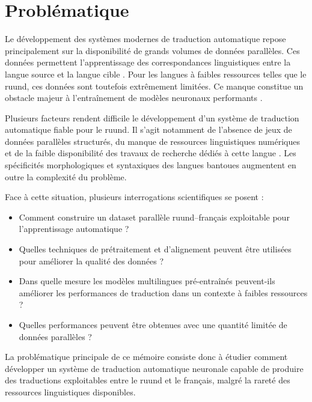 \section{Problématique}

Le développement des systèmes modernes de traduction automatique repose principalement sur la disponibilité de grands volumes de données parallèles. Ces données permettent l'apprentissage des correspondances linguistiques entre la langue source et la langue cible \cite{ranathunga2023neural}. Pour les langues à faibles ressources telles que le ruund, ces données sont toutefois extrêmement limitées. Ce manque constitue un obstacle majeur à l'entraînement de modèles neuronaux performants \cite{haulai2023construction, agyei2024low}.

Plusieurs facteurs rendent difficile le développement d'un système de traduction automatique fiable pour le ruund. Il s'agit notamment de l'absence de jeux de données parallèles structurés, du manque de ressources linguistiques numériques et de la faible disponibilité des travaux de recherche dédiés à cette langue \cite{jindal2017building, haulai2023construction}. Les spécificités morphologiques et syntaxiques des langues bantoues augmentent en outre la complexité du problème.

Face à cette situation, plusieurs interrogations scientifiques se posent :

\begin{itemize}
    \item Comment construire un dataset parallèle ruund--français exploitable pour l'apprentissage automatique ?

    \item Quelles techniques de prétraitement et d'alignement peuvent être utilisées pour améliorer la qualité des données  ?

    \item Dans quelle mesure les modèles multilingues pré-entraînés peuvent-ils améliorer les performances de traduction dans un contexte à faibles ressources ?

    \item Quelles performances peuvent être obtenues avec une quantité limitée de données parallèles ?
\end{itemize}

La problématique principale de ce mémoire consiste donc à étudier comment développer un système de traduction automatique neuronale capable de produire des traductions exploitables entre le ruund et le français, malgré la rareté des ressources linguistiques disponibles.


